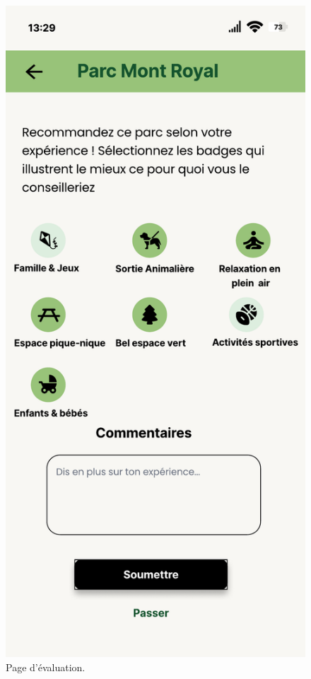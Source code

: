 \documentclass[12pt,a4paper]{article}
\begin{document}
\begin{figure}[h!]
  \centering
  \includegraphics[width=0.5\linewidth]{attachments/Evaluation1.pdf}
  \caption{Page d'évaluation.}
\end{figure}
\end{document}
